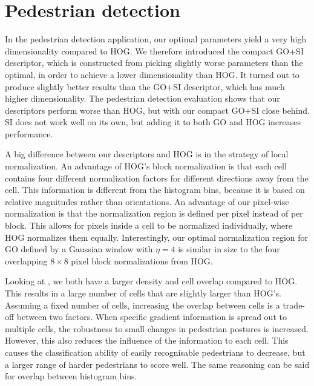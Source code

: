 \documentclass[thesis.tex]{subfiles}
\begin{document}
\section{Pedestrian detection}
\label{sec:discussionOd}
In the pedestrian detection application, our optimal parameters yield a very high dimensionality compared to HOG. We therefore introduced the compact GO+SI descriptor, which is constructed from picking slightly worse parameters than the optimal, in order to achieve a lower dimensionality than HOG. It turned out to produce slightly better results than the GO+SI descriptor, which has much higher dimensionality. The pedestrian detection evaluation shows that our descriptors perform worse than HOG, but with our compact GO+SI close behind. SI does not work well on its own, but adding it to both GO and HOG increases performance.

A big difference between our descriptors and HOG is in the strategy of local normalization. An advantage of HOG's block normalization is that each cell contains four different normalization factors for different directions away from the cell. This information is different from the histogram bins, because it is based on relative magnitudes rather than orientations. An advantage of our pixel-wise normalization is that the normalization region is defined per pixel instead of per block. This allows for pixels inside a cell to be normalized individually, where HOG normalizes them equally. Interestingly, our optimal normalization region for GO defined by a Gaussian window with $\eta = 4$ is similar in size to the four overlapping $8 \times 8$ pixel block normalizations from HOG.


Looking at , we both have a larger density and cell overlap compared to HOG. This results in a large number of cells that are slightly larger than HOG's. Assuming a fixed number of cells, increasing the overlap between cells is a trade-off between two factors. When specific gradient information is spread out to multiple cells, the robustness to small changes in pedestrian postures is increased. However, this also reduces the influence of the information to each cell. This causes the classification ability of easily recognisable pedestrians to decrease, but a larger range of harder pedestrians to score well. The same reasoning can be said for overlap between histogram bins.
\end{document}
